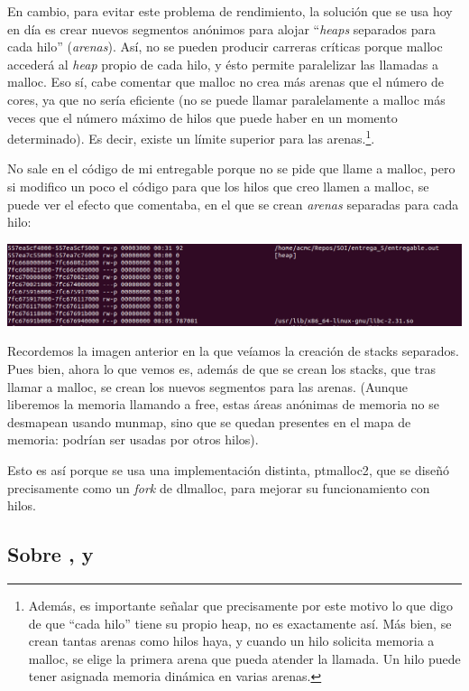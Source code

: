 \documentclass[a4paper]{article}
\begin{document}
En cambio, para evitar este problema de rendimiento, la solución que se usa hoy en día es crear nuevos segmentos anónimos para alojar ``\emph{heaps} separados para cada hilo'' (\emph{arenas}). Así, no se pueden producir carreras críticas porque {\ttfamily malloc} accederá al \emph{heap} propio de cada hilo, y ésto permite paralelizar las llamadas a {\ttfamily malloc}. Eso sí, cabe comentar que {\ttfamily malloc} no crea más arenas que el número de cores, ya que no sería eficiente (no se puede llamar paralelamente a {\ttfamily malloc} más veces que el número máximo de hilos que puede haber en un momento determinado). Es decir, existe un límite superior para las arenas.\footnote{Además, es importante señalar que precisamente por este motivo lo que digo de que ``cada hilo'' tiene su propio heap, no es exactamente así. Más bien, se crean tantas arenas como hilos haya, y cuando un hilo solicita memoria a {\ttfamily malloc}, se elige la primera arena que pueda atender la llamada. Un hilo puede tener asignada memoria dinámica en varias arenas.}.

No sale en el código de mi entregable porque no se pide que llame a {\ttfamily malloc}, pero si modifico un poco el código para que los hilos que creo llamen a {\ttfamily malloc}, se puede ver el efecto que comentaba, en el que se crean \emph{arenas} separadas para cada hilo:

\includegraphics[scale=0.407]{Hilos_con_malloc.png}

Recordemos la imagen anterior en la que veíamos la creación de stacks separados. Pues bien, ahora lo que vemos es, además de que se crean los stacks, que tras llamar a {\ttfamily malloc}, se crean los nuevos segmentos para las arenas. (Aunque liberemos la memoria llamando a {\ttfamily free}, estas áreas anónimas de memoria no se desmapean usando {\ttfamily munmap}, sino que se quedan presentes en el mapa de memoria: podrían ser usadas por otros hilos).

Esto es así porque se usa una implementación distinta, {\ttfamily ptmalloc2}, que se diseñó precisamente como un \emph{fork} de {\ttfamily dlmalloc}, para mejorar su funcionamiento con hilos.

\subsection{Sobre {\ttfamily [vsyscall]}, {\ttfamily [vdso]} y {\ttfamily [vvar]}}
\end{document}
